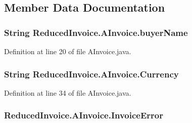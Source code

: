 \subsection{Member Data Documentation}
\hypertarget{class_reduced_invoice_1_1_a_invoice_ae75bdd20da8fa21dec01c2d032ac11c5}{
\subsubsection[{buyer\-Name}]{\setlength{\rightskip}{0pt plus 5cm}String Reduced\-Invoice.\-A\-Invoice.\-buyer\-Name\hspace{0.3cm}{\ttfamily [protected]}}}\label{class_reduced_invoice_1_1_a_invoice_ae75bdd20da8fa21dec01c2d032ac11c5}


Definition at line 20 of file A\-Invoice.\-java.

\hypertarget{class_reduced_invoice_1_1_a_invoice_a6b6ef26c85bc07f70cb7b4c8eb057fe8}{
\subsubsection[{Currency}]{\setlength{\rightskip}{0pt plus 5cm}String Reduced\-Invoice.\-A\-Invoice.\-Currency\hspace{0.3cm}{\ttfamily [protected]}}}\label{class_reduced_invoice_1_1_a_invoice_a6b6ef26c85bc07f70cb7b4c8eb057fe8}


Definition at line 34 of file A\-Invoice.\-java.

\hypertarget{class_reduced_invoice_1_1_a_invoice_a3ef6a3a4efa7e9b652f5399bc76e017a}{
\subsubsection[{Invoice\-Error}]{ Reduced\-Invoice.\-A\-Invoice.\-Invoice\-Error\hspace{0.3cm}{\ttfamily [protected]}}}\label{class_reduced_invoice_1_1_a_invoice_a3ef6a3a4efa7e9b652f5399bc76e017a}



